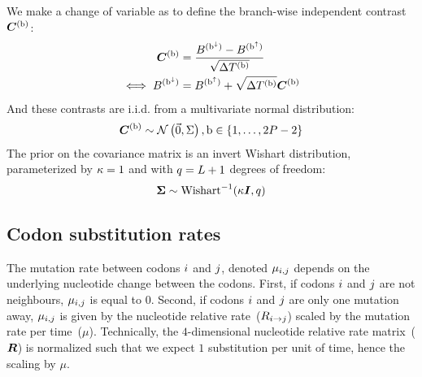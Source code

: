 We make a change of variable as to define the branch-wise independent contrast $\bm{C}^{(\text{b})}$:
\begin{align}
    \contrast\branchexp &= \dfrac{\brownian^{(\nodeDown)} - \brownian^{(\nodeUp)}}{\sqrt{\branchtime\branchexp}} \\
    \label{eq:independent_contrast}
    \iff \brownian^{(\nodeDown)} &= \brownian^{(\nodeUp)} + \sqrt{\branchtime\branchexp}\contrast\branchexp
\end{align}
And these contrasts are i.i.d.
from a multivariate normal distribution:
\begin{equation}
    \label{eq:Distribcontrast}
    \contrast\branchexp \sim \mathcal{N}\left(\vecZero, \Covariancematrix \right), \Setbranch
\end{equation}
The prior on the covariance matrix is an invert Wishart distribution, parameterized by $\kappa=1$ and with $q=L + 1$ degrees of freedom:
\begin{equation}
    \label{eq:Distribcovariance}
    \CovarianceMatrix \sim \text{Wishart}^{-1} (\covariancekappa \Identitymatrix, \covariancedf)
\end{equation}

\subsection{Codon substitution rates}

The mutation rate between codons ${i}$ and ${j}$, denoted $\mu_{{i}, {j}}$ depends on the underlying nucleotide change between the codons.
First, if codons ${i}$ and ${j}$ are not neighbours, $\mu_{{i}, {j}}$ is equal to $0$.
Second, if codons ${i}$ and ${j}$ are only one mutation away, $\mu_{{i}, {j}}$ is given by the nucleotide relative rate~(${R_{{i} \rightarrow {j}}}$) scaled by the mutation rate per time~($\mu$).
Technically, the $4$-dimensional nucleotide relative rate matrix~($\bm{R}$) is normalized such that we expect $1$ substitution per unit of time, hence the scaling by $\mu$.

